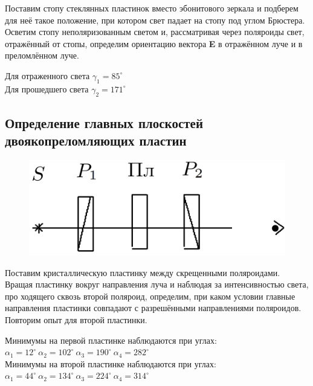 	Поставим стопу стеклянных пластинок вместо эбонитового зеркала и подберем для неё такое положение, при котором свет падает на стопу под углом Брюстера. Осветим стопу неполяризованным светом и, рассматривая через поляроиды свет, отражённый от стопы, определим ориентацию вектора
	\textbf{E} в отражённом луче и в преломлённом луче.
		
	\begin{center}
		Для отраженного света $\gamma_1 = 85^{\circ}$ \\
		Для прошедшего света $\gamma_2 = 171^{\circ}$
	\end{center} 

	\subsection*{Определение главных плоскостей двоякопреломляющих пластин}
	
	\begin{figure}
		\centering
		\includegraphics[width=0.5\textheight]{./images/IV.png}
		\caption{}
	\end{figure}
	
	Поставим кристаллическую пластинку между скрещенными поляроидами. Вращая пластинку вокруг направления луча и наблюдая за интенсивностью света, про ходящего сквозь второй поляроид, определим, при каком условии главные направления пластинки совпадают с разрешёнными направлениями поляроидов. Повторим опыт для второй пластинки.
	
	\begin{center}
		Минимумы на первой пластинке наблюдаются при углах:\\
		$\alpha_1 = 12^{\circ} ~ \alpha_2 = 102^{\circ} ~ \alpha_3 = 190^{\circ} ~ \alpha_4 = 282^{\circ}$\\
		Минимумы на второй пластинке наблюдаются при углах:\\
		$\alpha_1 = 44^{\circ} ~ \alpha_2 = 134^{\circ} ~ \alpha_3 = 224^{\circ} ~ \alpha_4 = 314^{\circ}$\\
	\end{center}
	
